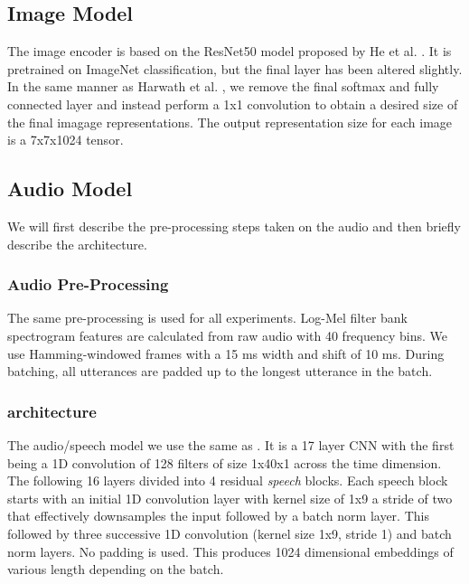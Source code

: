 \subsection{Image Model}
The image encoder is based on the ResNet50 model proposed by He et al. \cite{he2016deep}.
It is pretrained on ImageNet classification, but the final layer has been altered slightly.
In the same manner as Harwath et al. \cite{harwath2019learning}, we remove the final softmax and fully connected layer and instead perform a 1x1 convolution to obtain a desired size of the final imagage representations.
The output representation size for each image is a 7x7x1024 tensor.
\subsection{Audio Model}
We will first describe the pre-processing steps taken on the audio and then briefly describe the architecture.
\subsubsection{Audio Pre-Processing}
The same pre-processing is used for all experiments.
Log-Mel filter bank spectrogram features are calculated from raw audio with 40 frequency bins.
We use Hamming-windowed frames with a 15 ms width and shift of 10 ms.
During batching, all utterances are padded up to the longest utterance in the batch.
\subsubsection{architecture}
The audio/speech model we use the same as \cite{harwath2019learning}. 
It is a 17 layer CNN with the first being a 1D convolution of 128 filters of size 1x40x1 across the time dimension.
The following 16 layers divided into 4 residual \textit{speech} blocks.
Each speech block starts with an initial 1D convolution layer with kernel size of 1x9 a stride of two that effectively downsamples the input followed by a batch norm layer.
This followed by three successive 1D convolution (kernel size 1x9, stride 1) and batch norm layers.
No padding is used.
This produces 1024 dimensional embeddings of various length depending on the batch.



%
